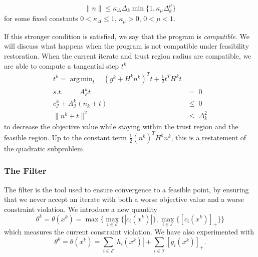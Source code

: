 \documentclass{article}
\DeclareMathOperator*{\argmin}{arg\,min}
\begin{document}
\begin{equation}
\label{compat}
\|n\|\le \kappa_{\Delta} \Delta_k \min \{1, \kappa_{\mu}\Delta_k^{\mu}\}
\end{equation}
for some fixed constants $0<\kappa_{\Delta}\le 1$, $\kappa_{\mu}>0$, $0<\mu<1$.

If this stronger condition is satisfied, we say that the program is \emph{compatible}.
We will discuss what happens when the program is not compatible under feasibility restoration.
When the current iterate and trust region radius are compatible, we are able to compute a tangential step $t^k$
\begin{align}
\label{tangent}
t^k =\argmin_t    \quad   (g^k+H^kn^k)^T t + \frac 1 2 t^T H^k t \\
s.t. \hspace{1cm} A_{\mathcal {E}}^kt	&= \; 0  \nonumber \\
     c_{\mathcal {I}}^k + A_{\mathcal {I}}^k(n_k + t)	& \le \; 0  \nonumber  \\
     \| n^k + t \|^2 		& \le \; \Delta_k ^2  \nonumber 
\end{align}
to decrease the objective value while staying within the trust region and the feasible region.
Up to the constant term $\frac 1 2 (n^k)^TH^k n^k$, this is a restatement of the quadratic subproblem.



\subsubsection{The Filter}

The filter is the tool used to ensure convergence to a feasible point, by ensuring that we never accept an iterate with both a worse objective value and a worse constraint violation.
We introduce a new quantity
\[
\theta^k = \theta(x^k) = \max \{\max_{i \in \mathcal E} \{| c_i(x^k) | \} , \max_{i \in \mathcal I} \{ [c_i(x^k)]_+            \}\}
\]
which measures the current constraint violation.
We have also experimented with
\[
\label {l2}
\theta^k = \theta(x^k) = \sum_{i \in \mathcal E} | h_i(x^k) | + \sum_{i \in \mathcal I} [g_i(x^k)]_+.
\]
\end{document}
